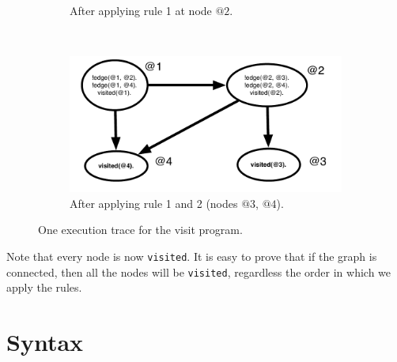 \begin{figure}
\begin{subfigure}[b]{0.5\textwidth}
                \caption{After applying rule 1 at node $@2$.}
                \label{fig:exec_trace3}
        \end{subfigure}%
        ~ %
        \begin{subfigure}[b]{0.5\textwidth}
                  \includegraphics[width=\textwidth]{execution_trace4}
                  \caption{After applying rule 1 and 2 (nodes $@3$, $@4$).}
                  \label{fig:exec_trace4}
          \end{subfigure}
        \caption{One execution trace for the visit program.}\label{fig:exec_trace}
\end{figure}

Note that every node is now \texttt{visited}. It is easy to prove that if the graph is
connected, then all the nodes will be \texttt{visited}, regardless the order in which we
apply the rules.

\section{Syntax}

\renewcommand{\arraystretch}{1.5}


